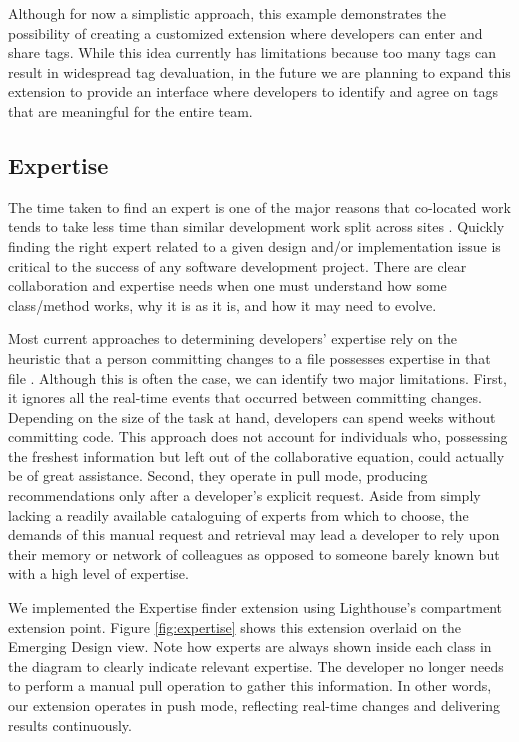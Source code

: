 \documentclass[10pt, conference, compsocconf]{IEEEtran}
\begin{document}
Although for now a simplistic approach, this example demonstrates the possibility of creating a customized extension where developers can enter and share tags.  While this idea currently has limitations because too many tags can result in widespread tag devaluation, in the future we are planning to expand this extension to provide an interface where developers to identify and agree on tags that are meaningful for the entire team.  

\subsection{Expertise}

The time taken to find an expert is one of the major reasons that co-located work tends to take less time than similar development work split across sites \cite{Reilly:2005}. Quickly finding the right expert related to a given design and/or implementation issue is critical to the success of any software development project. There are clear collaboration and expertise needs when one must understand how some class/method works, why it is as it is, and how it may need to evolve. 

Most current approaches to determining developers' expertise rely on the heuristic that a person committing changes to a file possesses expertise in that file \cite{Fritz:2010}. Although this is often the case, we can identify two major limitations. First, it ignores all the real-time events that occurred between committing changes. Depending on the size of the task at hand, developers can spend weeks without committing code. This approach does not account for individuals who, possessing the freshest information but left out of the collaborative equation, could actually be of great assistance. Second, they operate in pull mode, producing recommendations only after a developer's explicit request.  Aside from simply lacking a readily available cataloguing of experts from which to choose, the demands of this manual request and retrieval may lead a developer to rely upon their memory or network of colleagues as opposed to someone barely known but with a high level of expertise.

We implemented the Expertise finder extension using Lighthouse's compartment extension point.  Figure \ref{fig:expertise} shows this extension overlaid on the Emerging Design view. Note how experts are always shown inside each class in the diagram to clearly indicate relevant expertise. The developer no longer needs to perform a manual pull operation to gather this information. In other words, our extension operates in push mode, reflecting real-time changes and delivering results continuously.
\end{document}
